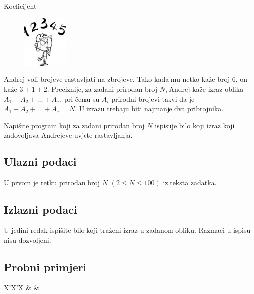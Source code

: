 \begin{statement}[
  problempoints=20,
  timelimit=1 sekunda,
  memorylimit=512 MiB,
]{Koeficijent}

\setlength\intextsep{-0.1cm}
\begin{figure}
\centering
\includegraphics[width=0.2\textwidth]{img/plenki.jpeg}
\end{figure}

Andrej voli brojeve rastavljati na zbrojeve. Tako kada mu netko kaže broj $6$,
on kaže $3+1+2$. Preciznije, za zadani prirodan broj $N$, Andrej kaže izraz
oblika $A_1+A_2+\dots+A_x$, pri čemu su $A_i$ prirodni brojevi takvi da je
$A_1+A_2+\dots+A_x=N$. U izrazu trebaju biti najmanje dva pribrojnika.

Napišite program koji za zadani prirodan broj $N$ ispisuje bilo koji izraz koji
zadovoljava Andrejeve uvjete rastavljanja.


\subsection*{Ulazni podaci}
U prvom je retku prirodan broj $N$ $(2 \le N \le 100)$ iz teksta zadatka.

\subsection*{Izlazni podaci}
U jedini redak ispišite bilo koji traženi izraz u zadanom obliku. Razmaci u
ispisu nisu dozvoljeni.


\subsection*{Probni primjeri}
\begin{tabularx}{\textwidth}{X'X'X}
 &
 &
\end{tabularx}


\end{statement}

